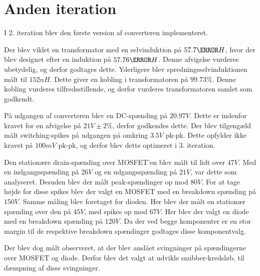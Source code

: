 
\section{Anden iteration}
I 2. iteration blev den første version af converteren implementeret.

Der blev viklet en transformator med en selvinduktion på $57.7\micro H$, hvor der blev designet efter en induktion på $57.76\micro H$. Denne afvigelse vurderes ubetydelig, og derfor godtages dette. Yderligere blev spredningsselvinduktionen målt til $152nH$. Dette giver en kobling i transformatoren på $99.73\percent$. Denne kobling vurderes tilfredsstillende, og derfor vurderes transformatoren samlet som godkendt. 

På udgangen af converteren blev en DC-spænding på $20.97V$. Dette er indenfor kravet for en afvigelse på $21V \pm2\percent$, derfor godkendes dette. Der blev tilgengæld målt switching-spikes på udgangen på omkring $3.5V$ pk-pk. Dette opfylder ikke kravet på $100mV$ pk-pk, og derfor blev dette optimeret i 3. iteration. 

Den stationære drain-spænding over MOSFET'en blev målt til lidt over $47V$. Med en indgangsspænding på $26V$ og en udgangsspænding på $21V$, var dette som analyseret. Desuden blev der målt peak-spændinger op mod $80V$. For at tage højde for disse spikes blev der valgt en MOSFET med en breakdown spænding på $150V$. Samme måling blev foretaget for dioden. Her blev der målt en stationær spænding over den på $45V$, med spikes op mod $67V$. Her blev der valgt en diode med en breakdown spænding på $120V$. Da der ved begge komponenter er en stor margin til de respektive breakdown spændinger godtages disse komponentvalg.

Der blev dog målt observeret, at der blev anslået svingninger på spændingerne over MOSFET og diode. Derfor blev det valgt at udvikle snubber-kredsløb, til dæmpning af disse svingninger. 

 